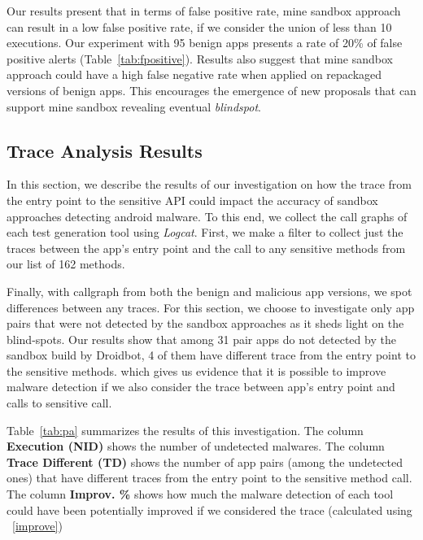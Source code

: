 \begin{obs}{1}{}
   Our results present that in terms of false positive rate, mine sandbox approach can result in a low false positive rate, if we consider the union of less than 10 executions. Our experiment with 95 benign apps presents a rate of  20\% of false positive alerts (Table~\ref{tab:fpositive}). Results also suggest that mine sandbox approach could have a high false negative rate when applied on repackaged versions of benign apps. This encourages the emergence of new proposals that can support mine sandbox revealing eventual \textit{blindspot}.
 \end{obs}



\subsection{Trace Analysis Results}\label{sec:traceResults}

In this section, we describe the results of our investigation on how the trace from the entry point to the sensitive API could impact the accuracy of sandbox approaches detecting android malware. To this end, we collect the call graphs of each test generation tool using \emph{Logcat}. First, we make a filter to collect just the traces between the app's entry point and the call to any sensitive methods from our list of 162 methods.

Finally, with callgraph from both the benign and malicious app versions, we spot differences between any traces. For this section, we choose to investigate only app pairs that were not detected by the sandbox approaches as it sheds light on the blind-spots. Our results show that among 31 pair apps do not detected by the sandbox build by Droidbot, 4 of them have different trace from the entry point to the sensitive methods. which gives us evidence that it is possible to improve malware detection if we also consider the trace between app's entry point and calls to sensitive call.

Table~\ref{tab:pa} summarizes the results of this investigation. The column \textbf{Execution (NID)} shows the number of undetected malwares. The column  \textbf{Trace Different (TD)} shows the number of app pairs (among the undetected ones) that have different traces from the entry point to the sensitive method call. The column \textbf{Improv. \%} shows how much the malware detection of each tool could have been potentially improved if we considered the trace (calculated using ~\eqref{improve})


